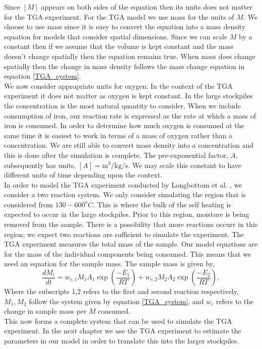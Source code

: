 Since $\left[M\right]$ appears on both sides of the equation then its units does not matter for the TGA experiment. For the TGA model we use mass for the units of $M$. We choose to use mass since it is easy to convert the equation into a mass density equation for models that consider spatial dimensions. Since we can scale $M$ by a constant then if we assume that the volume is kept constant and the mass doesn't change spatially then the equation remains true. When mass does change spatially then the change in mass density follows the mass change equation in equation \ref{TGA_system}.\\
We now consider appropriate units for oxygen. In the context of the TGA experiment it does not matter as oxygen is kept constant. In the large stockpiles the concentration is the most natural quantity to consider. When we include consumption of iron, our reaction rate is expressed as the rate at which a mass of iron is consumed. In order to determine how much oxygen is consumed at the same time it is easiest to work in terms of a mass of oxygen rather than a concentration. We are still able to convert mass density into a concentration and this is done after the simulation is complete. The pre-exponential factor, $A$, subsequently has units, $[A]=\text{m}^3/\text{kg}/\text{s}$. We may scale this constant to have different units of time depending upon the context.\\
In order to model the TGA experiment conducted by Longbottom et al. \cite{Ray19}, we consider a two reaction system. We only consider simulating the region that is considered from $130-600^oC$. This is where the bulk of the self heating is expected to occur in the large stockpiles. Prior to this region, moisture is being removed from the sample. There is a possibility that more reactions occurr in this region; we expect two reactions are sufficient to simulate the experiment. The TGA experiment measures the total mass of the sample. Our model equations are for the mass of the individual components being consumed. This means that we need an equation for the sample mass.
The sample mass is given by,
\begin{equation}
\frac{dM_t}{dt}=w_{c,1}M_1A_1\exp\left(\frac{-E_1}{RT}\right)+w_{c,2}M_2A_2\exp\left(\frac{-E_2}{RT}\right), \label{FWC_equation}
\end{equation}
Where the subscripts 1,2 refers to the first and second reaction respectively, $M_1,M_2$ follow the system given by equation \ref{TGA_system}, and $w_c$ refers to the change in sample mass per $M$ consumed.\\
This now forms a complete system that can be used to simulate the TGA experiment. In the next chapter we use the TGA experiment to estimate the parameters in our model in order to translate this into the larger stockpiles. 

